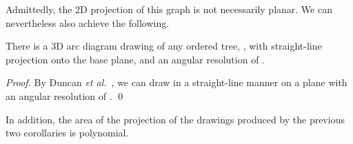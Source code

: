 Admittedly, the 2D projection of this graph is not necessarily planar.
We can nevertheless also achieve the following.

\begin{corollary}
There is a 3D arc diagram drawing of any ordered tree, ,
with straight-line projection onto the base plane,
and an angular resolution of .
\end{corollary}
\begin{proof}
By Duncan {\it et al.}~\cite{degkn-dtp-11},
we can draw 
in a straight-line manner on a plane with an angular resolution of .
\qed
\end{proof}

In addition, the area of the projection of the drawings produced by the
previous two corollaries is polynomial.

